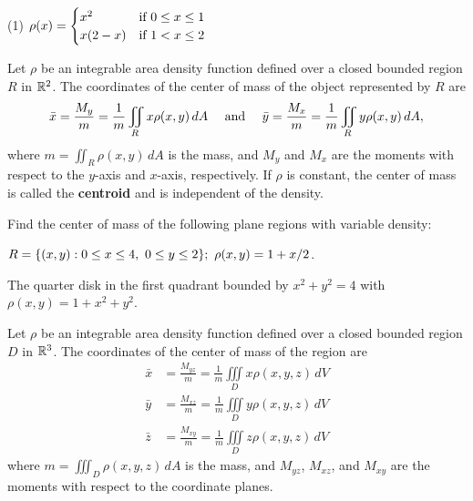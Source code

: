 \documentclass[../mathNotesPreamble]{subfiles}
\begin{document}
  \begin{tasks}[after-item-skip=\stretch{1}, label=, resume](1)
    \task 
      $\rho(x)=\begin{cases}
        x^2& \textnormal{if } 0\leq x\leq 1\\
        x(2-x)& \textnormal{if } 1<x\leq 2
      \end{cases}$
  \end{tasks}
  \pagebreak

  \begin{defn*}
    Let $\rho$ be an integrable area density function defined over a closed bounded region $R$ in $\mathbb{R}^2$. The coordinates of the center of mass of the object represented by $R$ are
      \[\bar{x}=\frac{M_y}{m}=\frac{1}{m}\iint\limits_R x\rho(x,y)\,dA\quad \textnormal{ and }\quad \bar{y}=\frac{M_x}{m}=\frac{1}{m}\iint\limits_R y\rho(x,y)\,dA,\]
    where $m=\iint_R \rho(x,y)\,dA$ is the mass, and $M_y$ and $M_x$ are the moments with respect to the $y$-axis and $x$-axis, respectively. If $\rho$ is constant, the center of mass is called the \textbf{centroid} and is independent of the density.
  \end{defn*}
  \begin{ex*}
    Find the center of mass of the following plane regions with variable density:
  \end{ex*}
  $R={\left\{(x,y): 0\leq x\leq 4,\ 0\leq y\leq 2\right\}};\ \rho(x,y)=1+x/2$.
  \pagebreak

  The quarter disk in the first quadrant bounded by $x^2+y^2=4$ with $\rho(x,y)=1+x^2+y^2$.
  \pagebreak

  \begin{defn*}
    Let $\rho$ be an integrable area density function defined over a closed bounded region $D$ in $\mathbb{R}^3$. The coordinates of the center of mass of the region are
    \begin{align*}
      \bar{x}&=\frac{M_{yz}}{m}=\frac{1}{m}\iiint\limits_D x\rho(x,y,z)\,dV\\
      \bar{y}&=\frac{M_{xz}}{m}=\frac{1}{m}\iiint\limits_D y\rho(x,y,z)\,dV\\
      \bar{z}&=\frac{M_{xy}}{m}=\frac{1}{m}\iiint\limits_D z\rho(x,y,z)\,dV
    \end{align*}
    where $m=\iiint_D \rho(x,y,z)\,dA$ is the mass, and $M_{yz}$, $M_{xz}$, and $M_{xy}$ are the moments with respect to the coordinate planes.
  \end{defn*}

  \pagebreak
  
\end{document}
